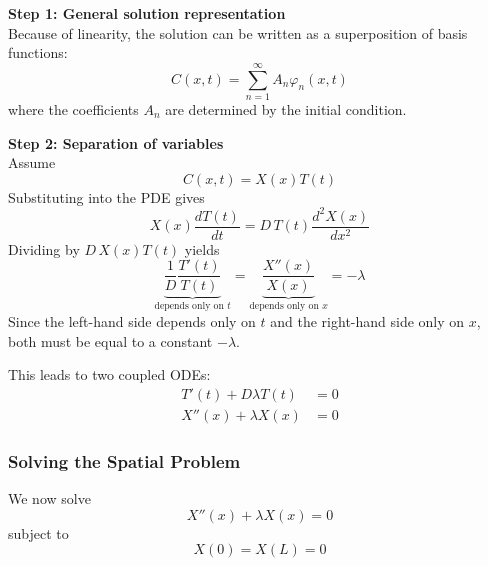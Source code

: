 \textbf{Step 1: General solution representation} \\
Because of linearity, the solution can be written as a superposition of basis functions:
\begin{equation}
    C(x,t)=\sum_{n=1}^{\infty} A_n \varphi_n(x,t)
\end{equation}
where the coefficients $A_n$ are determined by the initial condition.

\vspace{0.5cm}
\textbf{Step 2: Separation of variables} \\
Assume
\begin{equation}
    C(x,t)=X(x)T(t)
\end{equation}
Substituting into the PDE gives
\begin{equation*}
    X(x)\frac{dT(t)}{dt}=D\,T(t)\frac{d^2X(x)}{dx^2}
\end{equation*}
Dividing by $D\,X(x)T(t)$ yields
\begin{equation}
    \underbrace{\frac{1}{D}\frac{T'(t)}{T(t)}}_{\text{depends only on } t}
    =
    \underbrace{\frac{X''(x)}{X(x)}}_{\text{depends only on } x}
    =-\lambda
\end{equation}
Since the left-hand side depends only on $t$ and the right-hand side only on $x$, both must be equal to a constant $-\lambda$.

This leads to two coupled ODEs:
\begin{align}
    T'(t)+D\lambda T(t) &= 0 \\
    X''(x)+\lambda X(x) &= 0
\end{align}

\subsubsection{Solving the Spatial Problem}

We now solve
\begin{equation}
    X''(x)+\lambda X(x)=0
\end{equation}
subject to
\begin{equation}
    X(0)=X(L)=0
\end{equation}

